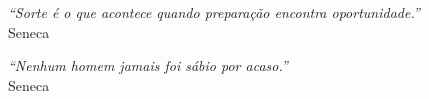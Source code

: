 


\begin{epigrafe}

\vspace*{\fill}\lang
{
}
{
    \begin{flushright}
        \textit{``Sorte é o que acontece quando preparação encontra oportunidade.''} \\ Seneca
    \end{flushright}
    \begin{flushright}
        \textit{``Nenhum homem jamais foi sábio por acaso.''} \\ Seneca
    \end{flushright}
}

\end{epigrafe}


